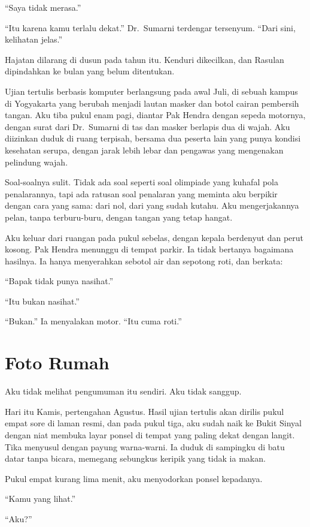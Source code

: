\documentclass[11pt,twoside,openany]{book}
\makeatletter
\newcommand{\scenebreak}{\par\vspace{0.9em}{\centering\textsc{*\hspace{0.7em}*\hspace{0.7em}*}\par}\vspace{0.9em}\@afterindentfalse\@afterheading}
\makeatother
\begin{document}
``Saya tidak merasa.''

``Itu karena kamu terlalu dekat.'' Dr.~Sumarni terdengar tersenyum. ``Dari sini, kelihatan jelas.''

\scenebreak
Hajatan dilarang di dusun pada tahun itu. Kenduri dikecilkan, dan Rasulan dipindahkan ke bulan yang belum ditentukan.

Ujian tertulis berbasis komputer berlangsung pada awal Juli, di sebuah kampus di Yogyakarta yang berubah menjadi lautan masker dan botol cairan pembersih tangan. Aku tiba pukul enam pagi, diantar Pak Hendra dengan sepeda motornya, dengan surat dari Dr.~Sumarni di tas dan masker berlapis dua di wajah. Aku diizinkan duduk di ruang terpisah, bersama dua peserta lain yang punya kondisi kesehatan serupa, dengan jarak lebih lebar dan pengawas yang mengenakan pelindung wajah.

Soal-soalnya sulit. Tidak ada soal seperti soal olimpiade yang kuhafal pola penalarannya, tapi ada ratusan soal penalaran yang meminta aku berpikir dengan cara yang sama: dari nol, dari yang sudah kutahu. Aku mengerjakannya pelan, tanpa terburu-buru, dengan tangan yang tetap hangat.

Aku keluar dari ruangan pada pukul sebelas, dengan kepala berdenyut dan perut kosong. Pak Hendra menunggu di tempat parkir. Ia tidak bertanya bagaimana hasilnya. Ia hanya menyerahkan sebotol air dan sepotong roti, dan berkata:

``Bapak tidak punya nasihat.''

``Itu bukan nasihat.''

``Bukan.'' Ia menyalakan motor. ``Itu cuma roti.''

\chapter{Foto Rumah}
Aku tidak melihat pengumuman itu sendiri. Aku tidak sanggup.

Hari itu Kamis, pertengahan Agustus. Hasil ujian tertulis akan dirilis pukul empat sore di laman resmi, dan pada pukul tiga, aku sudah naik ke Bukit Sinyal dengan niat membuka layar ponsel di tempat yang paling dekat dengan langit. Tika menyusul dengan payung warna-warni. Ia duduk di sampingku di batu datar tanpa bicara, memegang sebungkus keripik yang tidak ia makan.

Pukul empat kurang lima menit, aku menyodorkan ponsel kepadanya.

``Kamu yang lihat.''

``Aku?''
\end{document}
